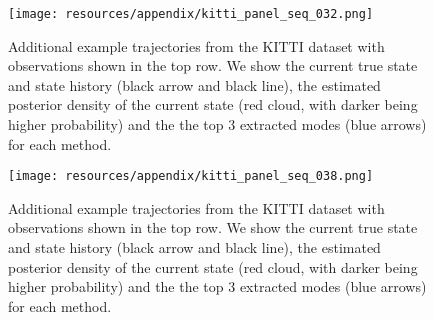     \begin{figure}[ht]
        \centering
        \texttt{[image: resources/appendix/kitti\_panel\_seq\_032.png]}
        \caption{\small{Additional example trajectories from the KITTI dataset with observations shown in the top row. We show the current true state and state history (black arrow and black line), the estimated posterior density of the current state (red cloud, with darker being higher probability) and the the top 3 extracted modes (blue arrows) for each method.}}
        \label{appx_fig:kitti_panel_2}
    \end{figure}


    \begin{figure}[ht]
        \centering
        \texttt{[image: resources/appendix/kitti\_panel\_seq\_038.png]}
        \caption{\small{Additional example trajectories from the KITTI dataset with observations shown in the top row. We show the current true state and state history (black arrow and black line), the estimated posterior density of the current state (red cloud, with darker being higher probability) and the the top 3 extracted modes (blue arrows) for each method.}}
        \label{appx_fig:kitti_panel_3}
    \end{figure}

